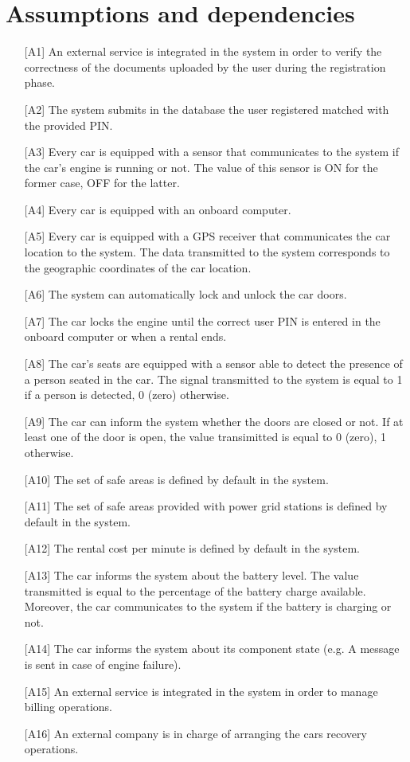 \section{Assumptions and dependencies}

\begin{itemize}
	\item[{[A1]}] An external service is integrated in the system in order to verify the correctness of the documents uploaded by the user during the registration phase.
	\item[{[A2]}] The system submits in the database the user registered matched with the provided PIN.
	\item[{[A3]}] Every car is equipped with a sensor that communicates to the system if the car's engine is running or not. The value of this sensor is ON for the former case, OFF for the latter.
	\item[{[A4]}] Every car is equipped with an onboard computer.
	\item[{[A5]}] Every car is equipped with a GPS receiver that communicates the car location to the system. The data transmitted to the system corresponds to the geographic coordinates of the car location.
	\item[{[A6]}] The system can automatically lock and unlock the car doors.
	\item[{[A7]}] The car locks the engine until the correct user PIN is entered in the onboard computer or when a rental ends.
	\item[{[A8]}] The car's seats are equipped with a sensor able to detect the presence of a person seated in the car. The signal transmitted to the system is equal to 1 if a person is detected, 0 (zero) otherwise.
	\item[{[A9]}] The car can inform the system whether the doors are closed or not. If at least one of the door is open, the value transimitted is equal to 0 (zero), 1 otherwise.
	\item[{[A10]}] The set of safe areas is defined by default in the system.
	\item[{[A11]}] The set of safe areas provided with power grid stations is defined by default in the system.
	\item[{[A12]}] The rental cost per minute is defined by default in the system.
	\item[{[A13]}] The car informs the system about the battery level. The value transmitted is equal to the percentage of the battery charge available. Moreover, the car communicates to the system if the battery is charging or not.
	\item[{[A14]}] The car informs the system about its component state (e.g. A message is sent in case of engine failure).
	\item[{[A15]}] An external service is integrated in the system in order to manage billing operations.
	\item[{[A16]}] An external company is in charge of arranging the cars recovery operations.
\end{itemize}
